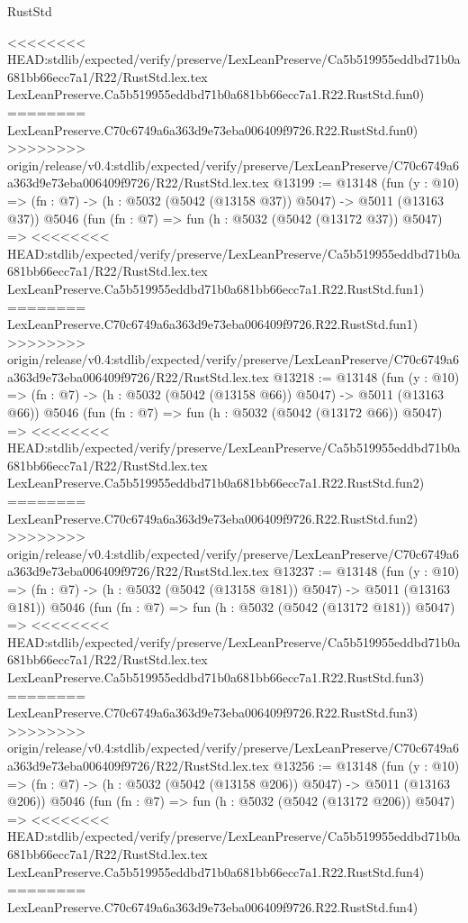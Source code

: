 \begin{lexlean}{RustStd}
\begin{coremodule}
{\begin{coremodule}
{{{{{{{{{{{{<<<<<<<< HEAD:stdlib/expected/verify/preserve/LexLeanPreserve/Ca5b519955eddbd71b0a681bb66ecc7a1/R22/RustStd.lex.tex
    LexLeanPreserve.Ca5b519955eddbd71b0a681bb66ecc7a1.R22.RustStd.fun0)
========
    LexLeanPreserve.C70c6749a6a363d9e73eba006409f9726.R22.RustStd.fun0)
>>>>>>>> origin/release/v0.4:stdlib/expected/verify/preserve/LexLeanPreserve/C70c6749a6a363d9e73eba006409f9726/R22/RustStd.lex.tex
@13199 := @13148
    (fun (y : @10) => (fn : @7) -> (h : @5032 (@5042 (@13158 @37)) @5047) -> @5011 (@13163 @37))
    @5046
    (fun (fn : @7) =>
    fun (h : @5032 (@5042 (@13172 @37)) @5047) =>
<<<<<<<< HEAD:stdlib/expected/verify/preserve/LexLeanPreserve/Ca5b519955eddbd71b0a681bb66ecc7a1/R22/RustStd.lex.tex
    LexLeanPreserve.Ca5b519955eddbd71b0a681bb66ecc7a1.R22.RustStd.fun1)
========
    LexLeanPreserve.C70c6749a6a363d9e73eba006409f9726.R22.RustStd.fun1)
>>>>>>>> origin/release/v0.4:stdlib/expected/verify/preserve/LexLeanPreserve/C70c6749a6a363d9e73eba006409f9726/R22/RustStd.lex.tex
@13218 := @13148
    (fun (y : @10) => (fn : @7) -> (h : @5032 (@5042 (@13158 @66)) @5047) -> @5011 (@13163 @66))
    @5046
    (fun (fn : @7) =>
    fun (h : @5032 (@5042 (@13172 @66)) @5047) =>
<<<<<<<< HEAD:stdlib/expected/verify/preserve/LexLeanPreserve/Ca5b519955eddbd71b0a681bb66ecc7a1/R22/RustStd.lex.tex
    LexLeanPreserve.Ca5b519955eddbd71b0a681bb66ecc7a1.R22.RustStd.fun2)
========
    LexLeanPreserve.C70c6749a6a363d9e73eba006409f9726.R22.RustStd.fun2)
>>>>>>>> origin/release/v0.4:stdlib/expected/verify/preserve/LexLeanPreserve/C70c6749a6a363d9e73eba006409f9726/R22/RustStd.lex.tex
@13237 := @13148
    (fun (y : @10) => (fn : @7) -> (h : @5032 (@5042 (@13158 @181)) @5047) -> @5011 (@13163 @181))
    @5046
    (fun (fn : @7) =>
    fun (h : @5032 (@5042 (@13172 @181)) @5047) =>
<<<<<<<< HEAD:stdlib/expected/verify/preserve/LexLeanPreserve/Ca5b519955eddbd71b0a681bb66ecc7a1/R22/RustStd.lex.tex
    LexLeanPreserve.Ca5b519955eddbd71b0a681bb66ecc7a1.R22.RustStd.fun3)
========
    LexLeanPreserve.C70c6749a6a363d9e73eba006409f9726.R22.RustStd.fun3)
>>>>>>>> origin/release/v0.4:stdlib/expected/verify/preserve/LexLeanPreserve/C70c6749a6a363d9e73eba006409f9726/R22/RustStd.lex.tex
@13256 := @13148
    (fun (y : @10) => (fn : @7) -> (h : @5032 (@5042 (@13158 @206)) @5047) -> @5011 (@13163 @206))
    @5046
    (fun (fn : @7) =>
    fun (h : @5032 (@5042 (@13172 @206)) @5047) =>
<<<<<<<< HEAD:stdlib/expected/verify/preserve/LexLeanPreserve/Ca5b519955eddbd71b0a681bb66ecc7a1/R22/RustStd.lex.tex
    LexLeanPreserve.Ca5b519955eddbd71b0a681bb66ecc7a1.R22.RustStd.fun4)
========
    LexLeanPreserve.C70c6749a6a363d9e73eba006409f9726.R22.RustStd.fun4)
}}}}}}}}}}}}
\end{coremodule}}
\end{coremodule}
\end{lexlean}
